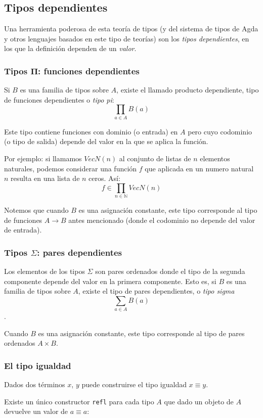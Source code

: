 \documentclass[11pt]{article} %
\begin{document}
\subsection{Tipos dependientes}
Una herramienta poderosa de esta teoría de tipos (y del sistema de tipos de Agda y otros lenguajes basados en este tipo de teorías) son los \textit{tipos dependientes}, en los que la definición dependen de un \textit{valor}. 

\subsubsection{Tipos Π: funciones dependientes}
Si $B$ es una familia de tipos sobre $A$, existe el llamado producto dependiente, tipo de funciones dependientes o \textit{tipo pi}:
\[ \prod_{a\in A}B(a)
    \]

Este tipo contiene funciones con dominio (o entrada) en $A$ pero cuyo codominio (o tipo de salida) depende del valor en la que se aplica la función. 

Por ejemplo: si llamamos $VecN(n)$ al conjunto de listas de $n$ elementos naturales, podemos considerar una función $f$ que aplicada en un numero natural $n$ resulta en una lista de $n$ ceros. Así: 
\[
  f \in \prod_{n \in \mathbb{N}} VecN(n)
\]

Notemos que cuando $B$ es una asignación constante, este tipo corresponde al tipo de funciones $A \rightarrow B$ antes mencionado (donde el codominio no depende del valor de entrada).


\subsubsection{Tipos $\Sigma$: pares dependientes}
Los elementos de los tipos $\Sigma$ son pares ordenados donde el tipo de la segunda componente depende del valor en la primera componente. Esto es, si $B$ es una familia de tipos sobre $A$, existe el tipo de pares dependientes, o \textit{tipo sigma} \[ \sum_{a \in A} B(a) \].

Cuando $B$ es una asignación constante, este tipo corresponde al tipo de pares ordenados $A \times B$.

\subsubsection{El tipo igualdad}
Dados dos términos $x$, $y$ puede construirse el tipo igualdad $x \equiv y$. 

Existe un único constructor \texttt{refl} para cada tipo $A$ que dado un objeto de $A$ devuelve un valor de $a \equiv a$:
\end{document}
